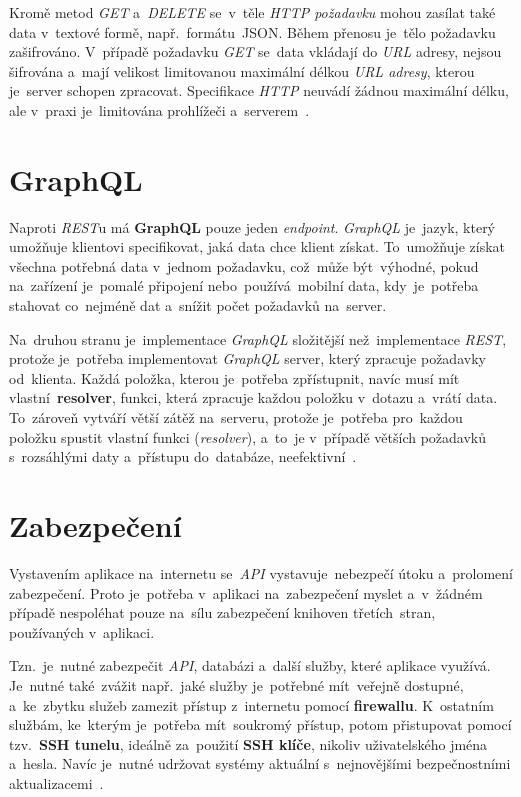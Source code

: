 \documentclass[11pt,a4paper]{report}
\let\oldacrshort\acrshort
\renewcommand{\acrshort}[1]{\emph{\normalsize\color[rgb]{0,0,0}\noindent\oldacrshort{#1}}}
\begin{document}
            Kromě metod \emph{GET} a~\emph{DELETE} se~v~těle \emph{HTTP požadavku} mohou zasílat také data v~textové formě, např.~formátu~JSON. Během přenosu je~tělo požadavku zašifrováno. V~případě požadavku \emph{GET} se~data vkládají do \acrshort{URL} adresy, nejsou šifrována a~mají velikost limitovanou maximální délkou \emph{URL adresy}, kterou je~server schopen zpracovat. Specifikace \acrshort{HTTP} neuvádí žádnou maximální délku, ale v~praxi je~limitována prohlížeči a~serverem~\cite[3.2.1]{ietf-httpbis-messaging-03}.

        \section{GraphQL}
            Naproti \acrshort{REST}u má \textbf{GraphQL} pouze jeden \emph{endpoint}. \emph{GraphQL} je~jazyk, který umožňuje klientovi specifikovat, jaká data chce klient získat. To~umožňuje získat všechna potřebná data v~jednom požadavku, což~může být~výhodné, pokud na~zařízení je~pomalé připojení nebo~používá~mobilní data, kdy~je~potřeba stahovat co~nejméně dat a~snížit počet požadavků na~server.

            Na~druhou stranu je~implementace \emph{GraphQL} složitější než~implementace \acrshort{REST}, protože je~potřeba implementovat \emph{GraphQL} server, který zpracuje požadavky od~klienta. Každá položka, kterou je~potřeba zpřístupnit, navíc musí mít vlastní~\textbf{resolver}, funkci, která zpracuje každou položku v~dotazu a~vrátí data. To~zároveň vytváří větší zátěž na~serveru, protože je~potřeba pro~každou položku spustit vlastní funkci (\emph{resolver}), a~to~je v~případě větších požadavků s~rozsáhlými daty a~přístupu do~databáze, neefektivní~\cite{Herrera:restgraphql, Dorman:webmappingajax}.

        \section{Zabezpečení}
            Vystavením aplikace na~internetu se~\acrshort{API} vystavuje~nebezpečí útoku a~prolomení zabezpečení. Proto je~potřeba v~aplikaci na~zabezpečení myslet a~v~žádném případě nespoléhat pouze na~sílu zabezpečení knihoven třetích~stran, používaných v~aplikaci.
            
            Tzn.~je~nutné zabezpečit \acrshort{API}, databázi a~další služby, které aplikace využívá. Je~nutné také~zvážit např.~jaké služby je~potřebné mít~veřejně dostupné, a~ke~zbytku služeb zamezit přístup z~internetu pomocí \textbf{firewallu}. K~ostatním službám, ke~kterým je~potřeba mít~soukromý přístup, potom přistupovat pomocí tzv.~\textbf{SSH tunelu}, ideálně za~použití \textbf{SSH klíče}, nikoliv uživatelského jména a~hesla. Navíc je~nutné udržovat systémy aktuální s~nejnovějšími bezpečnostními aktualizacemi~\cite{graham2021ethical, Dorman:webmappingajax}.
            
\end{document}
